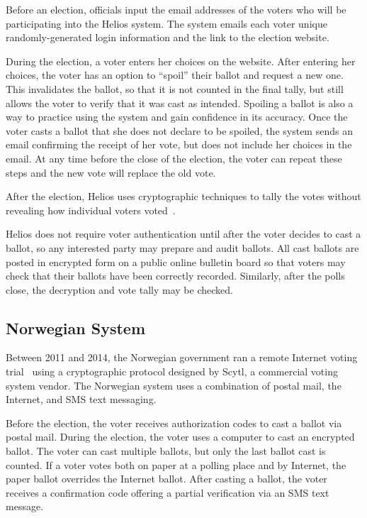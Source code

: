 Before an election, officials input the email addresses of the voters
who will be participating into the Helios system. The system emails
each voter unique randomly-generated login information and the link to
the election website.

During the election, a voter enters her choices on the website. After
entering her choices, the voter has an option to ``spoil'' their
ballot and request a new one. This invalidates the ballot, so that it
is not counted in the final tally, but still allows the voter to
verify that it was cast as intended. Spoiling a ballot is also a way
to practice using the system and gain confidence in its accuracy. Once
the voter casts a ballot that she does not declare to be spoiled, the
system sends an email confirming the receipt of her vote, but does not
include her choices in the email. At any time before the close of the
election, the voter can repeat these steps and the new vote will
replace the old vote.

After the election, Helios uses cryptographic techniques to tally the
votes without revealing how individual voters
voted~\cite{bulens2011,tsoukalas2013}.

Helios does not require voter authentication until after the voter
decides to cast a ballot, so any interested party may prepare and
audit ballots. All cast ballots are posted in encrypted form on a
public online bulletin board so that voters may check that their
ballots have been correctly recorded. Similarly, after the polls
close, the decryption and vote tally may be checked.

\subsection{Norwegian System}

Between 2011 and 2014, the Norwegian government ran a remote Internet
voting trial~\cite{gjosteen2012} using a cryptographic protocol
designed by Scytl, a commercial voting system vendor.  The Norwegian
system uses a combination of postal mail, the Internet, and SMS text
messaging. 

Before the election, the voter receives authorization codes to cast a
ballot via postal mail. During the election, the voter uses a computer
to cast an encrypted ballot. The voter can cast multiple ballots, but
only the last ballot cast is counted. If a voter votes both on paper
at a polling place and by Internet, the paper ballot overrides the
Internet ballot. After casting a ballot, the voter receives a
confirmation code offering a partial verification via an SMS text
message.

